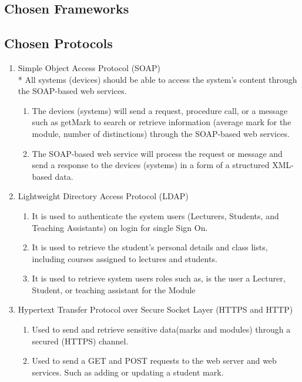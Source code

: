 \documentclass[12pt]{article}
\begin{document}
		
		\subsection{Chosen Frameworks}
					\vspace{0.2in}	
			
		
		\subsection{Chosen Protocols}
			\begin{enumerate}
	                    \item Simple Object Access Protocol (SOAP) \\*
	                    All systems (devices) should be able to access the system’s content through the SOAP-based web services. 
	                        \begin{enumerate}
	                            \item The devices (systems) will send a request, procedure call, or a message such as getMark to search or retrieve information (average mark for the module, number of distinctions) through the SOAP-based web services.
	                            \item The SOAP-based web service will process the request or message and send a response to the devices (systems) in a form of a structured XML-based data.
	                        \end{enumerate}
	                    \item Lightweight Directory Access Protocol (LDAP)
	                        \begin{enumerate}
	                            \item It is used to authenticate the system users (Lecturers, Students, and Teaching Assistants) on login for single Sign On.
	                            \item It is used to retrieve the student’s personal details and class lists, including courses assigned to lectures and students.
	                            \item It is used to retrieve system users roles such as, is the user a Lecturer, Student, or teaching assistant for the Module
	                        \end{enumerate}
	                    \item  Hypertext Transfer Protocol over Secure Socket Layer (HTTPS and HTTP)
	                        \begin{enumerate}
	                            \item Used to send and retrieve sensitive data(marks and modules) through a secured (HTTPS) channel.
	                            \item Used to send a GET and POST requests to the web server and web services. Such as adding or updating a student mark.
	                        \end{enumerate}
	                        
              		\end{enumerate}
\end{document}
